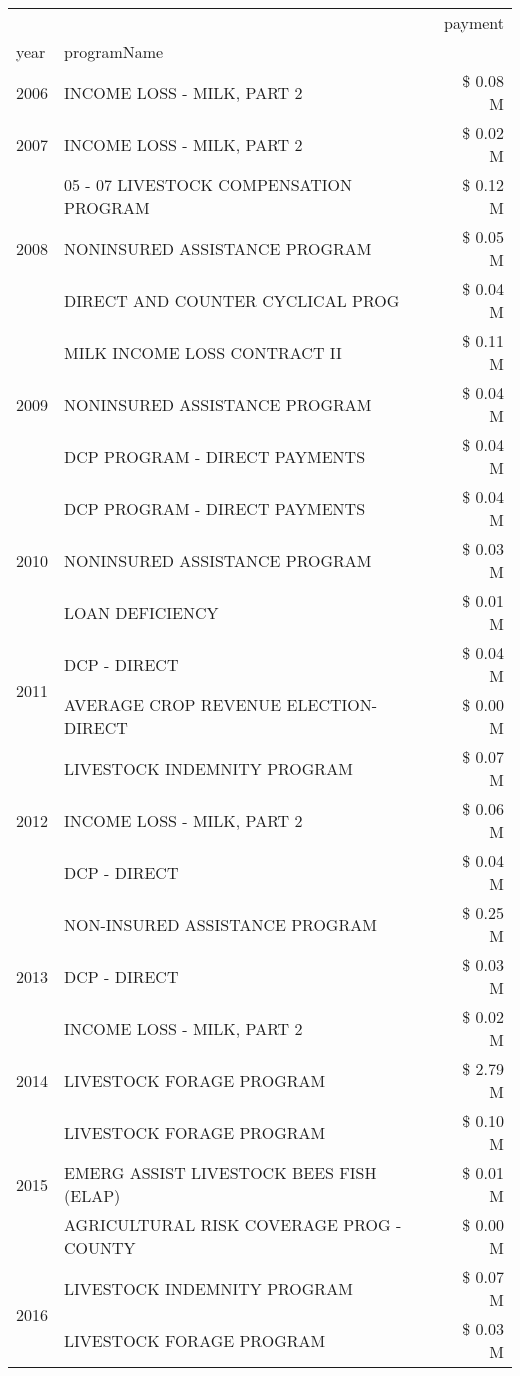 \begin{tabular}{llr}
\toprule
 &  & payment \\
year & programName &  \\
\midrule
2006 & INCOME LOSS - MILK, PART 2 & \$ 0.08 M \\
\cline{1-3}
2007 & INCOME LOSS - MILK, PART 2 & \$ 0.02 M \\
\cline{1-3}
\multirow[t]{3}{*}{2008} & 05 - 07 LIVESTOCK COMPENSATION PROGRAM & \$ 0.12 M \\
 & NONINSURED ASSISTANCE PROGRAM & \$ 0.05 M \\
 & DIRECT AND COUNTER CYCLICAL PROG & \$ 0.04 M \\
\cline{1-3}
\multirow[t]{3}{*}{2009} & MILK INCOME LOSS CONTRACT II & \$ 0.11 M \\
 & NONINSURED ASSISTANCE PROGRAM & \$ 0.04 M \\
 & DCP PROGRAM - DIRECT PAYMENTS & \$ 0.04 M \\
\cline{1-3}
\multirow[t]{3}{*}{2010} & DCP PROGRAM - DIRECT PAYMENTS & \$ 0.04 M \\
 & NONINSURED ASSISTANCE PROGRAM & \$ 0.03 M \\
 & LOAN DEFICIENCY & \$ 0.01 M \\
\cline{1-3}
\multirow[t]{2}{*}{2011} & DCP - DIRECT & \$ 0.04 M \\
 & AVERAGE CROP REVENUE ELECTION-DIRECT & \$ 0.00 M \\
\cline{1-3}
\multirow[t]{3}{*}{2012} & LIVESTOCK INDEMNITY PROGRAM & \$ 0.07 M \\
 & INCOME LOSS - MILK, PART 2 & \$ 0.06 M \\
 & DCP - DIRECT & \$ 0.04 M \\
\cline{1-3}
\multirow[t]{3}{*}{2013} & NON-INSURED ASSISTANCE PROGRAM & \$ 0.25 M \\
 & DCP - DIRECT & \$ 0.03 M \\
 & INCOME LOSS - MILK, PART 2 & \$ 0.02 M \\
\cline{1-3}
2014 & LIVESTOCK FORAGE PROGRAM & \$ 2.79 M \\
\cline{1-3}
\multirow[t]{3}{*}{2015} & LIVESTOCK FORAGE PROGRAM & \$ 0.10 M \\
 & EMERG ASSIST LIVESTOCK BEES FISH (ELAP) & \$ 0.01 M \\
 & AGRICULTURAL RISK COVERAGE PROG - COUNTY & \$ 0.00 M \\
\cline{1-3}
\multirow[t]{3}{*}{2016} & LIVESTOCK INDEMNITY PROGRAM & \$ 0.07 M \\
 & LIVESTOCK FORAGE PROGRAM & \$ 0.03 M \\

\end{tabular}
